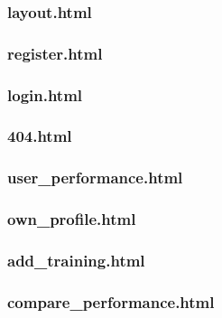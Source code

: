 \documentclass{article}[12pt,a4paper]
\begin{document}
\subsubsection{layout.html}


\subsubsection{register.html}


\subsubsection{login.html}


\subsubsection{404.html}


\subsubsection{user\_performance.html}


\subsubsection{own\_profile.html}


\subsubsection{add\_training.html}


\subsubsection{compare\_performance.html}

\end{document}
